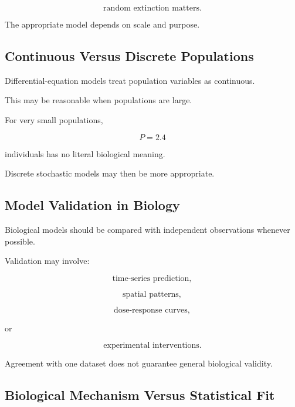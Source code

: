 \[
\boxed{
\text{random extinction matters}.
}
\]

The appropriate model depends on scale and purpose.

\subsection{Continuous Versus Discrete Populations}
\label{subsec:continuous-discrete-populations}

Differential-equation models treat population variables as continuous.

This may be reasonable when populations are large.

For very small populations,

\[
\boxed{
P=2.4
}
\]

individuals has no literal biological meaning.

Discrete stochastic models may then be more appropriate.

\subsection{Model Validation in Biology}
\label{subsec:biological-model-validation}

Biological models should be compared with independent observations whenever
possible.

Validation may involve:

\[
\boxed{
\text{time-series prediction},
}
\]

\[
\boxed{
\text{spatial patterns},
}
\]

\[
\boxed{
\text{dose-response curves},
}
\]

or

\[
\boxed{
\text{experimental interventions}.
}
\]

Agreement with one dataset does not guarantee general biological validity.

\subsection{Biological Mechanism Versus Statistical Fit}
\label{subsec:biology-mechanism-fit}

